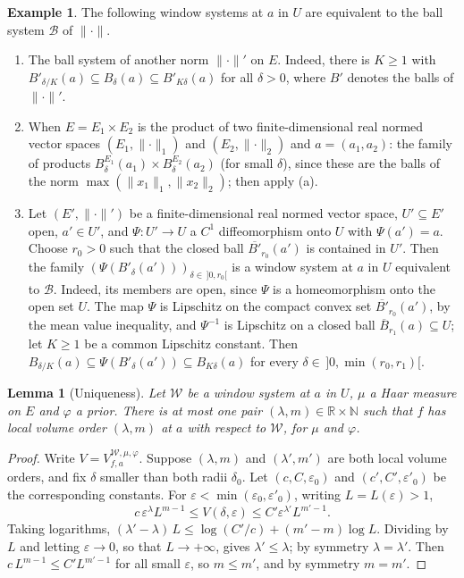 \documentclass[11pt,a4paper]{article}
\newtheorem{lemma}[theorem]{Lemma}
\theoremstyle{definition}
\newtheorem{example}[theorem]{Example}
\theoremstyle{remark}
\numberwithin{equation}{section}
\newcommand{\N}{\mathbb{N}}
\newcommand{\R}{\mathbb{R}}
\newcommand{\norm}[1]{\lVert #1\rVert}
\newcommand{\eps}{\varepsilon}
\begin{document}
\begin{example}\label{ex:windows}
The following window systems at $a$ in $U$ are equivalent to the ball system $\mathcal B$ of $\norm\cdot$.
\begin{enumerate}[label=\textup{(\alph*)}]
\item The ball system of another norm $\norm\cdot'$ on $E$. Indeed, there is $K\ge1$ with $B'_{\delta/K}(a)\subseteq B_\delta(a)\subseteq B'_{K\delta}(a)$ for all $\delta>0$, where $B'$ denotes the balls of $\norm\cdot'$.
\item When $E=E_1\times E_2$ is the product of two finite-dimensional real normed vector spaces $(E_1,\norm\cdot_1)$ and $(E_2,\norm\cdot_2)$ and $a=(a_1,a_2)$: the family of products $B^{E_1}_\delta(a_1)\times B^{E_2}_\delta(a_2)$ (for small $\delta$), since these are the balls of the norm $\max(\norm{x_1}_1,\norm{x_2}_2)$; then apply (a).
\item Let $(E',\norm\cdot')$ be a finite-dimensional real normed vector space, $U'\subseteq E'$ open, $a'\in U'$, and $\Psi:U'\to U$ a $C^1$ diffeomorphism onto $U$ with $\Psi(a')=a$. Choose $r_0>0$ such that the closed ball $\overline{B'}_{r_0}(a')$ is contained in $U'$. Then the family $(\Psi(B'_\delta(a')))_{\delta\in\,]0,r_0[}$ is a window system at $a$ in $U$ equivalent to $\mathcal B$. Indeed, its members are open, since $\Psi$ is a homeomorphism onto the open set $U$. The map $\Psi$ is Lipschitz on the compact convex set $\overline{B'}_{r_0}(a')$, by the mean value inequality, and $\Psi^{-1}$ is Lipschitz on a closed ball $\overline B_{r_1}(a)\subseteq U$; let $K\ge1$ be a common Lipschitz constant. Then $B_{\delta/K}(a)\subseteq\Psi(B'_\delta(a'))\subseteq B_{K\delta}(a)$ for every $\delta\in\,]0,\min(r_0,r_1)[$.
\end{enumerate}
\end{example}

\begin{lemma}[Uniqueness]\label{lem:unique}
Let $\mathcal W$ be a window system at $a$ in $U$, $\mu$ a Haar measure on $E$ and $\varphi$ a prior. There is at most one pair $(\lambda,m)\in\R\times\N$ such that $f$ has local volume order $(\lambda,m)$ at $a$ with respect to $\mathcal W$, for $\mu$ and $\varphi$.
\end{lemma}
\begin{proof}
Write $V=V^{\mathcal W,\mu,\varphi}_{f,a}$. Suppose $(\lambda,m)$ and $(\lambda',m')$ are both local volume orders, and fix $\delta$ smaller than both radii $\delta_0$. Let $(c,C,\eps_0)$ and $(c',C',\eps'_0)$ be the corresponding constants. For $\eps<\min(\eps_0,\eps'_0)$, writing $L=L(\eps)>1$,
\[
c\,\eps^\lambda L^{m-1}\le V(\delta,\eps)\le C'\eps^{\lambda'}L^{m'-1}.
\]
Taking logarithms, $(\lambda'-\lambda)\,L\le\log(C'/c)+(m'-m)\log L$. Dividing by $L$ and letting $\eps\to0$, so that $L\to+\infty$, gives $\lambda'\le\lambda$; by symmetry $\lambda=\lambda'$. Then $c\,L^{m-1}\le C'L^{m'-1}$ for all small $\eps$, so $m\le m'$, and by symmetry $m=m'$.
\end{proof}
\end{document}
